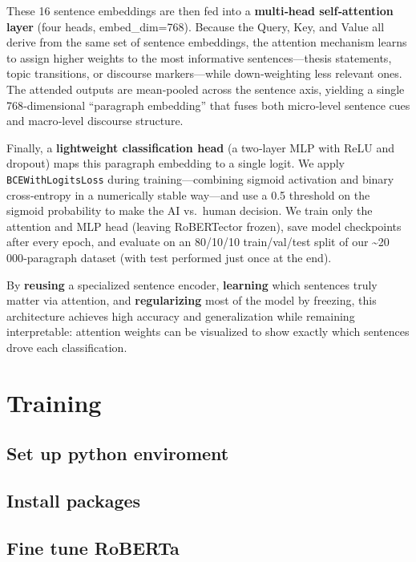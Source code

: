 \documentclass[
]{article}
\begin{document}
These 16 sentence embeddings are then fed into a \textbf{multi‑head
self‑attention layer} (four heads, embed\_dim=768). Because the Query,
Key, and Value all derive from the same set of sentence embeddings, the
attention mechanism learns to assign higher weights to the most
informative sentences---thesis statements, topic transitions, or
discourse markers---while down‑weighting less relevant ones. The
attended outputs are mean‑pooled across the sentence axis, yielding a
single 768‑dimensional ``paragraph embedding'' that fuses both
micro‑level sentence cues and macro‑level discourse structure.

Finally, a \textbf{lightweight classification head} (a two‑layer MLP
with ReLU and dropout) maps this paragraph embedding to a single logit.
We apply \texttt{BCEWithLogitsLoss} during training---combining sigmoid
activation and binary cross‑entropy in a numerically stable way---and
use a 0.5 threshold on the sigmoid probability to make the AI vs.~human
decision. We train only the attention and MLP head (leaving RoBERTector
frozen), save model checkpoints after every epoch, and evaluate on an
80/10/10 train/val/test split of our \textasciitilde20\,000‑paragraph
dataset (with test performed just once at the end).

By \textbf{reusing} a specialized sentence encoder, \textbf{learning}
which sentences truly matter via attention, and \textbf{regularizing}
most of the model by freezing, this architecture achieves high accuracy
and generalization while remaining interpretable: attention weights can
be visualized to show exactly which sentences drove each classification.

\section{Training}\label{training}

\subsection{Set up python enviroment}\label{set-up-python-enviroment}

\subsection{Install packages}\label{install-packages}

\subsection{Fine tune RoBERTa}\label{fine-tune-roberta}
\end{document}
